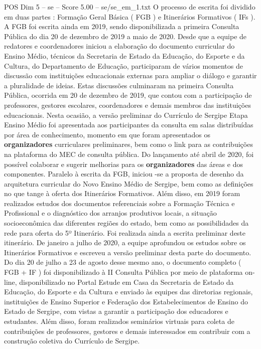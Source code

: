 \begin{textsample}{POS Dim 5 – se – Score 5.00 – se/se\_em\_1.txt}
O processo de escrita foi dividido em duas partes : Formação Geral Básica ( FGB ) e Itinerários Formativos ( IFs ).
A FGB foi escrita ainda em 2019, sendo disponibilizada a primeira Consulta Pública do dia 20 de dezembro de 2019 a maio de 2020.
Desde que a equipe de redatores e coordenadores iniciou a elaboração do documento curricular do Ensino Médio, técnicos da Secretaria de Estado da Educação, do Esporte e da Cultura, do Departamento de Educação, participaram de vários momentos de discussão com instituições educacionais externas para ampliar o diálogo e garantir a pluralidade de ideias.
Estas discussões culminaram na primeira Consulta Pública, ocorrida em 20 de dezembro de 2019, que contou com a participação de professores, gestores escolares, coordenadores e demais membros das instituições educacionais.
Nesta ocasião, a versão preliminar do Currículo de Sergipe Etapa Ensino Médio foi apresentada aos participantes da consulta em salas distribuídas por área de conhecimento, momento em que foram apresentados os \textbf{organizadores} curriculares preliminares, bem como o link para as contribuições na plataforma do MEC de consulta pública.
Do lançamento até abril de 2020, foi possível colaborar e sugerir melhorias para os \textbf{organizadores} das áreas e dos componentes.
Paralelo à escrita da FGB, iniciou -se a proposta de desenho da arquitetura curricular do Novo Ensino Médio de Sergipe, bem como as definições no que tange à oferta dos Itinerários Formativos.
Além disso, em 2019 foram realizados estudos dos documentos referenciais sobre a Formação Técnica e Profissional e o diagnóstico dos arranjos produtivos locais, a situação socioeconômica das diferentes regiões do estado, bem como as possibilidades da rede para oferta do 5º Itinerário.
Foi realizada ainda a escrita preliminar deste itinerário.
De janeiro a julho de 2020, a equipe aprofundou os estudos sobre os Itinerários Formativos e escreveu a versão preliminar desta parte do documento.
Do dia 20 de julho a 23 de agosto desse mesmo ano, o documento completo ( FGB + IF ) foi disponibilizado à II Consulta Pública por meio de plataforma on-line, disponibilizado no Portal Estude em Casa da Secretaria de Estado da Educação, do Esporte e da Cultura e enviado às equipes das diretorias regionais, instituições de Ensino Superior e Federação dos Estabelecimentos de Ensino do Estado de Sergipe, com vistas a garantir a participação dos educadores e estudantes.
Além disso, foram realizados seminários virtuais para coleta de contribuições de professores, gestores e demais interessados em contribuir com a construção coletiva do Currículo de Sergipe.

\end{textsample}
